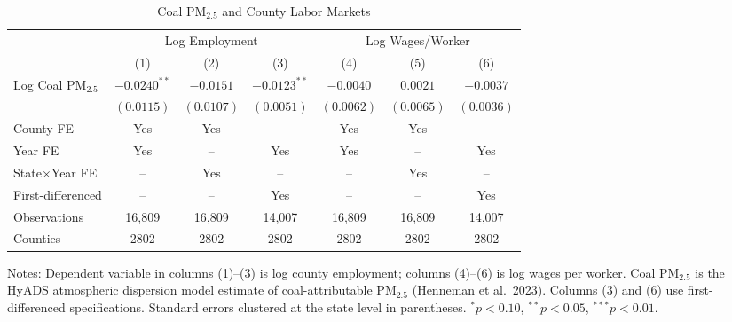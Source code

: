 \begin{table}[t]
\centering
\caption{Coal PM$_{2.5}$ and County Labor Markets}
\label{tab:main}
\begin{tabular}{lcccccc}
\hline\hline
 & \multicolumn{3}{c}{Log Employment} & \multicolumn{3}{c}{Log Wages/Worker} \\
 & (1) & (2) & (3) & (4) & (5) & (6) \\
\hline
Log Coal PM$_{2.5}$ & $-0.0240^{**}$ & $-0.0151$ & $-0.0123^{**}$ & $-0.0040$ & $0.0021$ & $-0.0037$ \\
 & $(0.0115)$ & $(0.0107)$ & $(0.0051)$ & $(0.0062)$ & $(0.0065)$ & $(0.0036)$ \\
\hline
County FE & Yes & Yes & -- & Yes & Yes & -- \\
Year FE & Yes & -- & Yes & Yes & -- & Yes \\
State$\times$Year FE & -- & Yes & -- & -- & Yes & -- \\
First-differenced & -- & -- & Yes & -- & -- & Yes \\
Observations & 16,809 & 16,809 & 14,007 & 16,809 & 16,809 & 14,007 \\
Counties & 2802 & 2802 & 2802 & 2802 & 2802 & 2802 \\
\hline\hline
\end{tabular}
\begin{flushleft}\small
Notes: Dependent variable in columns (1)--(3) is log county employment; columns (4)--(6) is log wages per worker. Coal PM$_{2.5}$ is the HyADS atmospheric dispersion model estimate of coal-attributable PM$_{2.5}$ (Henneman et al.\ 2023). Columns (3) and (6) use first-differenced specifications. Standard errors clustered at the state level in parentheses. $^{*}p<0.10$, $^{**}p<0.05$, $^{***}p<0.01$.
\end{flushleft}
\end{table}
